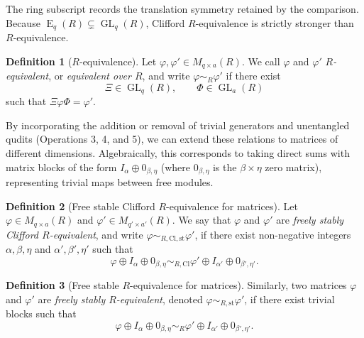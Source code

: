 \documentclass[aps,prx,english,superscriptaddress,twocolumn,tightenlines,showpacs,longbibliography,floatfix,amsfonts]{revtex4-2}
\theoremstyle{remark}
\theoremstyle{definition}
\newtheorem{definition}{Definition}
\begin{document}
The ring subscript records the translation symmetry retained by the
comparison. Because
$\operatorname{E}_q(R) \subsetneq \operatorname{GL}_q(R)$, Clifford
\(R\)-equivalence is strictly stronger than \(R\)-equivalence.

\begin{definition}[\(R\)-equivalence]
	Let $\varphi, \varphi' \in M_{q \times a}(R)$. We call $\varphi$ and $\varphi'$ \textit{\(R\)-equivalent}, or \textit{equivalent over \(R\)}, and write $\varphi \sim_R \varphi'$ if there exist
	\begin{equation}
		\Xi \in \operatorname{GL}_q(R), \qquad \Phi \in \operatorname{GL}_a(R)
	\end{equation}
	such that $\Xi \varphi \Phi = \varphi'$.
\end{definition}

By incorporating the addition or removal of trivial generators and unentangled qudits (Operations 3, 4, and 5), we can extend these relations to matrices of different dimensions. Algebraically, this corresponds to taking direct sums with matrix blocks of the form $I_\alpha \oplus 0_{\beta, \eta}$ (where $0_{\beta, \eta}$ is the $\beta \times \eta$ zero matrix), representing trivial maps between free modules.

\begin{definition}[Free stable Clifford \(R\)-equivalence for matrices]
	Let $\varphi \in M_{q \times a}(R)$ and $\varphi' \in M_{q' \times a'}(R)$. We say that $\varphi$ and $\varphi'$ are \textit{freely stably Clifford \(R\)-equivalent}, and write $\varphi \sim_{R,\mathrm{Cl},\mathrm{st}} \varphi'$, if there exist non-negative integers $\alpha, \beta, \eta$ and $\alpha', \beta', \eta'$ such that
	\begin{equation}
		\varphi \oplus I_{\alpha} \oplus 0_{\beta, \eta} \sim_{R,\mathrm{Cl}} \varphi' \oplus I_{\alpha'} \oplus 0_{\beta', \eta'}.
	\end{equation}
\end{definition}

\begin{definition}[Free stable \(R\)-equivalence for matrices]
	Similarly, two matrices $\varphi$ and $\varphi'$ are \textit{freely stably \(R\)-equivalent}, denoted $\varphi \sim_{R,\mathrm{st}} \varphi'$, if there exist trivial blocks such that
	\begin{equation}
		\varphi \oplus I_{\alpha} \oplus 0_{\beta, \eta} \sim_R \varphi' \oplus I_{\alpha'} \oplus 0_{\beta', \eta'}.
	\end{equation}
\end{definition}
\end{document}
